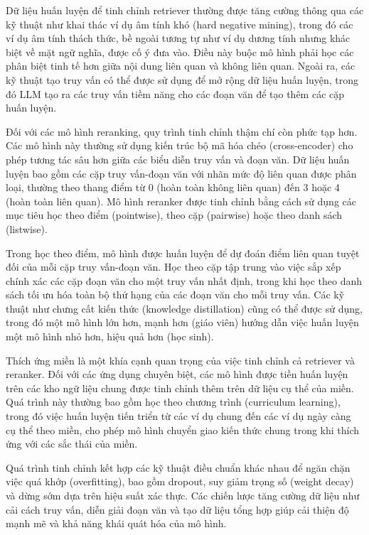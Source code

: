 \documentclass[../main.tex]{subfiles}
\begin{document}
Dữ liệu huấn luyện để tinh chỉnh retriever thường được tăng cường thông qua các kỹ thuật như khai thác ví dụ âm tính khó (hard negative mining), trong đó các ví dụ âm tính thách thức, bề ngoài tương tự như ví dụ dương tính nhưng khác biệt về mặt ngữ nghĩa, được cố ý đưa vào. Điều này buộc mô hình phải học các phân biệt tinh tế hơn giữa nội dung liên quan và không liên quan. Ngoài ra, các kỹ thuật tạo truy vấn có thể được sử dụng để mở rộng dữ liệu huấn luyện, trong đó LLM tạo ra các truy vấn tiềm năng cho các đoạn văn để tạo thêm các cặp huấn luyện.

Đối với các mô hình reranking, quy trình tinh chỉnh thậm chí còn phức tạp hơn. Các mô hình này thường sử dụng kiến trúc bộ mã hóa chéo (cross-encoder) cho phép tương tác sâu hơn giữa các biểu diễn truy vấn và đoạn văn. Dữ liệu huấn luyện bao gồm các cặp truy vấn-đoạn văn với nhãn mức độ liên quan được phân loại, thường theo thang điểm từ 0 (hoàn toàn không liên quan) đến 3 hoặc 4 (hoàn toàn liên quan). Mô hình reranker được tinh chỉnh bằng cách sử dụng các mục tiêu học theo điểm (pointwise), theo cặp (pairwise) hoặc theo danh sách (listwise).

Trong học theo điểm, mô hình được huấn luyện để dự đoán điểm liên quan tuyệt đối của mỗi cặp truy vấn-đoạn văn. Học theo cặp tập trung vào việc sắp xếp chính xác các cặp đoạn văn cho một truy vấn nhất định, trong khi học theo danh sách tối ưu hóa toàn bộ thứ hạng của các đoạn văn cho mỗi truy vấn. Các kỹ thuật như chưng cất kiến thức (knowledge distillation) cũng có thể được sử dụng, trong đó một mô hình lớn hơn, mạnh hơn (giáo viên) hướng dẫn việc huấn luyện một mô hình nhỏ hơn, hiệu quả hơn (học sinh).

Thích ứng miền là một khía cạnh quan trọng của việc tinh chỉnh cả retriever và reranker. Đối với các ứng dụng chuyên biệt, các mô hình được tiền huấn luyện trên các kho ngữ liệu chung được tinh chỉnh thêm trên dữ liệu cụ thể của miền. Quá trình này thường bao gồm học theo chương trình (curriculum learning), trong đó việc huấn luyện tiến triển từ các ví dụ chung đến các ví dụ ngày càng cụ thể theo miền, cho phép mô hình chuyển giao kiến thức chung trong khi thích ứng với các sắc thái của miền.

Quá trình tinh chỉnh kết hợp các kỹ thuật điều chuẩn khác nhau để ngăn chặn việc quá khớp (overfitting), bao gồm dropout, suy giảm trọng số (weight decay) và dừng sớm dựa trên hiệu suất xác thực. Các chiến lược tăng cường dữ liệu như cải cách truy vấn, diễn giải đoạn văn và tạo dữ liệu tổng hợp giúp cải thiện độ mạnh mẽ và khả năng khái quát hóa của mô hình.
\end{document}
